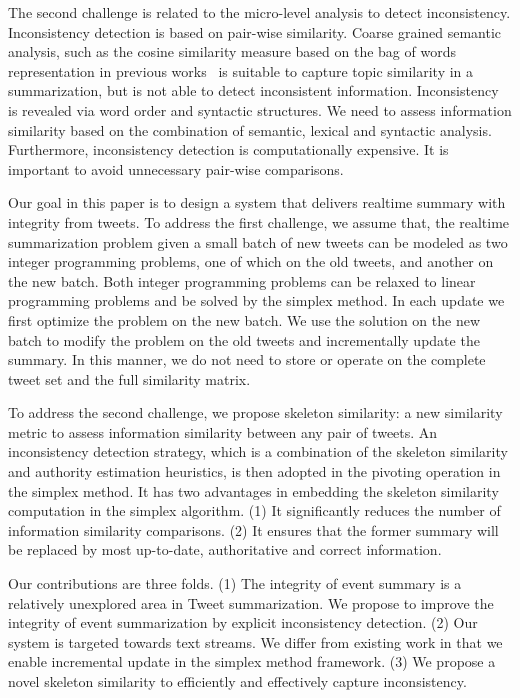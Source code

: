 \documentclass{llncs}
\begin{document}
The second challenge is related to the micro-level analysis to detect inconsistency. Inconsistency detection is based on pair-wise similarity. Coarse grained semantic analysis, such as the cosine similarity measure based on the bag of words representation in previous works~\cite{} is suitable to capture topic similarity in a summarization, but is not able to detect inconsistent information. Inconsistency is revealed via word order and syntactic structures. We need to assess information similarity based on the combination of semantic, lexical and syntactic analysis. Furthermore, inconsistency detection is computationally expensive. It is important to avoid unnecessary pair-wise comparisons.

Our goal in this paper is to design a system that delivers realtime summary with integrity from tweets. To address the first challenge, we assume that, the realtime summarization problem given a small batch of new tweets can be modeled as two integer programming problems, one of which on the old tweets, and another on the new batch. Both integer programming problems can be relaxed to linear programming problems and be solved by the simplex method. In each update we first optimize the problem on the new batch. We use the solution on the new batch to modify the problem on the old tweets and incrementally update the summary.  In this manner, we do not need to store or operate on the complete tweet set and the full similarity matrix.  


To address the second challenge, we propose skeleton similarity: a new similarity metric to assess information similarity between any pair of tweets. An inconsistency detection strategy, which is a combination of the skeleton similarity and authority estimation heuristics, is then adopted in the pivoting operation in the simplex method. It has two advantages in embedding the skeleton similarity computation in the simplex algorithm. (1) It significantly reduces the number of information similarity comparisons. (2) It ensures that the former summary will be replaced by most up-to-date, authoritative and correct information.


Our contributions are three folds. (1) The integrity of event summary is a relatively unexplored area in Tweet summarization. We propose to improve the integrity of event summarization by explicit inconsistency detection. (2) Our system is targeted towards text streams. We differ from existing work in that we enable incremental update in the simplex method framework. (3) We propose a novel skeleton similarity to efficiently and effectively capture inconsistency.
 
\end{document}
